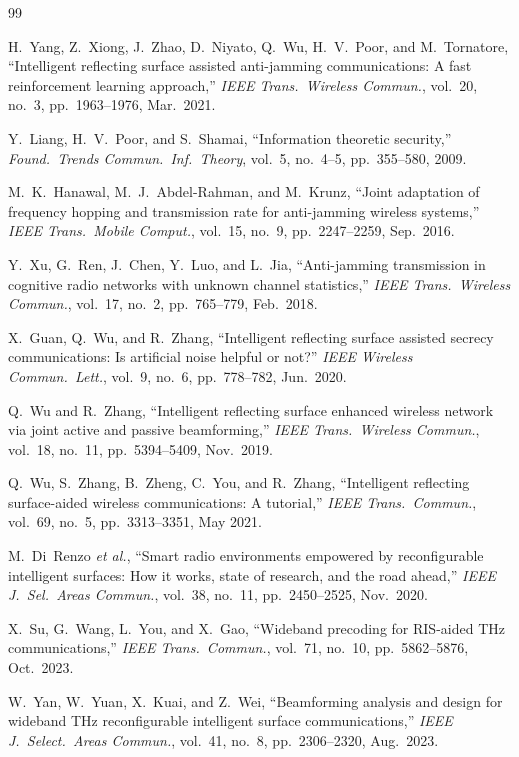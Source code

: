 \documentclass[journal,twocolumn]{IEEEtran}
\begin{document}
\begin{thebibliography}{99}

H.~Yang, Z.~Xiong, J.~Zhao, D.~Niyato, Q.~Wu, H.~V.~Poor, and M.~Tornatore,
``Intelligent reflecting surface assisted anti-jamming communications: A fast reinforcement learning approach,''
\emph{IEEE Trans.\ Wireless Commun.}, vol.~20, no.~3, pp.~1963--1976, Mar.\ 2021.

Y.~Liang, H.~V.~Poor, and S.~Shamai,
``Information theoretic security,''
\emph{Found.\ Trends Commun.\ Inf.\ Theory}, vol.~5, no.~4--5, pp.~355--580, 2009.

M.~K.~Hanawal, M.~J.~Abdel-Rahman, and M.~Krunz,
``Joint adaptation of frequency hopping and transmission rate for anti-jamming wireless systems,''
\emph{IEEE Trans.\ Mobile Comput.}, vol.~15, no.~9, pp.~2247--2259, Sep.\ 2016.

Y.~Xu, G.~Ren, J.~Chen, Y.~Luo, and L.~Jia,
``Anti-jamming transmission in cognitive radio networks with unknown channel statistics,''
\emph{IEEE Trans.\ Wireless Commun.}, vol.~17, no.~2, pp.~765--779, Feb.\ 2018.

X.~Guan, Q.~Wu, and R.~Zhang,
``Intelligent reflecting surface assisted secrecy communications: Is artificial noise helpful or not?''
\emph{IEEE Wireless Commun.\ Lett.}, vol.~9, no.~6, pp.~778--782, Jun.\ 2020.

Q.~Wu and R.~Zhang,
``Intelligent reflecting surface enhanced wireless network via joint active and passive beamforming,''
\emph{IEEE Trans.\ Wireless Commun.}, vol.~18, no.~11, pp.~5394--5409, Nov.\ 2019.

Q.~Wu, S.~Zhang, B.~Zheng, C.~You, and R.~Zhang,
``Intelligent reflecting surface-aided wireless communications: A tutorial,''
\emph{IEEE Trans.\ Commun.}, vol.~69, no.~5, pp.~3313--3351, May 2021.

M.~Di~Renzo \emph{et al.},
``Smart radio environments empowered by reconfigurable intelligent surfaces: How it works, state of research, and the road ahead,''
\emph{IEEE J.\ Sel.\ Areas Commun.}, vol.~38, no.~11, pp.~2450--2525, Nov.\ 2020.

X.~Su, G.~Wang, L.~You, and X.~Gao,
``Wideband precoding for RIS-aided THz communications,''
\emph{IEEE Trans.\ Commun.}, vol.~71, no.~10, pp.~5862--5876, Oct.\ 2023.

W.~Yan, W.~Yuan, X.~Kuai, and Z.~Wei,
``Beamforming analysis and design for wideband THz reconfigurable intelligent surface communications,''
\emph{IEEE J.\ Select.\ Areas Commun.}, vol.~41, no.~8, pp.~2306--2320, Aug.\ 2023.


\end{thebibliography}
\end{document}
